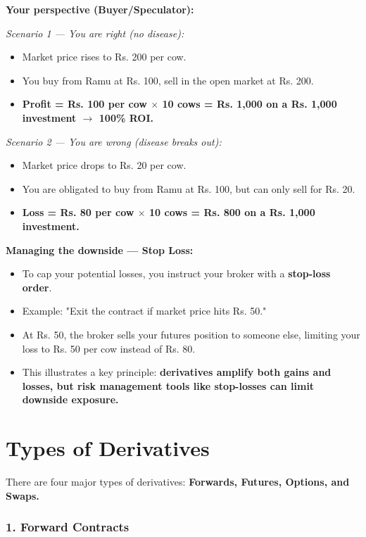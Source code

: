 \documentclass[12pt,openany]{book}
\begin{document}
\textbf{Your perspective (Buyer/Speculator):}

\emph{Scenario 1 --- You are right (no disease):}
\begin{itemize}[leftmargin=*]
    \item Market price rises to Rs. 200 per cow.
    \item You buy from Ramu at Rs. 100, sell in the open market at Rs. 200.
    \item \textbf{Profit = Rs. 100 per cow $\times$ 10 cows = Rs. 1,000 on a Rs. 1,000 investment $\rightarrow$ 100\% ROI.}
\end{itemize}

\emph{Scenario 2 --- You are wrong (disease breaks out):}
\begin{itemize}[leftmargin=*]
    \item Market price drops to Rs. 20 per cow.
    \item You are obligated to buy from Ramu at Rs. 100, but can only sell for Rs. 20.
    \item \textbf{Loss = Rs. 80 per cow $\times$ 10 cows = Rs. 800 on a Rs. 1,000 investment.}
\end{itemize}

\textbf{Managing the downside --- Stop Loss:}
\begin{itemize}[leftmargin=*]
    \item To cap your potential losses, you instruct your broker with a \textbf{stop-loss order}.
    \item Example: "Exit the contract if market price hits Rs. 50."
    \item At Rs. 50, the broker sells your futures position to someone else, limiting your loss to Rs. 50 per cow instead of Rs. 80.
    \item This illustrates a key principle: \textbf{derivatives amplify both gains and losses, but risk management tools like stop-losses can limit downside exposure.}
\end{itemize}

\section{Types of Derivatives}

There are four major types of derivatives: \textbf{Forwards, Futures, Options, and Swaps.}

\subsubsection{1. Forward Contracts}
\end{document}
